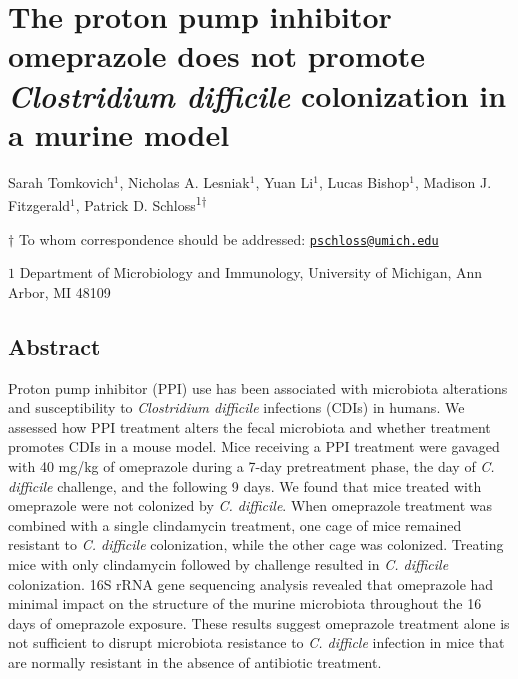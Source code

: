 \documentclass[11pt,]{article}
\title{}
\author{}
\date{}
\begin{document}
\vspace{35mm}

\section{\texorpdfstring{The proton pump inhibitor omeprazole does not
promote \emph{Clostridium difficile} colonization in a murine
model}{The proton pump inhibitor omeprazole does not promote Clostridium difficile colonization in a murine model}}\label{the-proton-pump-inhibitor-omeprazole-does-not-promote-clostridium-difficile-colonization-in-a-murine-model}

\vspace{35mm}

Sarah Tomkovich\({^1}\), Nicholas A. Lesniak\({^1}\), Yuan Li\({^1}\),
Lucas Bishop\({^1}\), Madison J. Fitzgerald\({^1}\), Patrick D.
Schloss\textsuperscript{1\(\dagger\)}

\vspace{40mm}

\(\dagger\) To whom correspondence should be addressed:
\href{mailto:pschloss@umich.edu}{\nolinkurl{pschloss@umich.edu}}

\(1\) Department of Microbiology and Immunology, University of Michigan,
Ann Arbor, MI 48109

\newpage

\linenumbers

\subsection{Abstract}\label{abstract}

Proton pump inhibitor (PPI) use has been associated with microbiota
alterations and susceptibility to \emph{Clostridium difficile}
infections (CDIs) in humans. We assessed how PPI treatment alters the
fecal microbiota and whether treatment promotes CDIs in a mouse model.
Mice receiving a PPI treatment were gavaged with 40 mg/kg of omeprazole
during a 7-day pretreatment phase, the day of \emph{C. difficile}
challenge, and the following 9 days. We found that mice treated with
omeprazole were not colonized by \emph{C. difficile}. When omeprazole
treatment was combined with a single clindamycin treatment, one cage of
mice remained resistant to \emph{C. difficile} colonization, while the
other cage was colonized. Treating mice with only clindamycin followed
by challenge resulted in \emph{C. difficile} colonization. 16S rRNA gene
sequencing analysis revealed that omeprazole had minimal impact on the
structure of the murine microbiota throughout the 16 days of omeprazole
exposure. These results suggest omeprazole treatment alone is not
sufficient to disrupt microbiota resistance to \emph{C. difficle}
infection in mice that are normally resistant in the absence of
antibiotic treatment.
\end{document}
